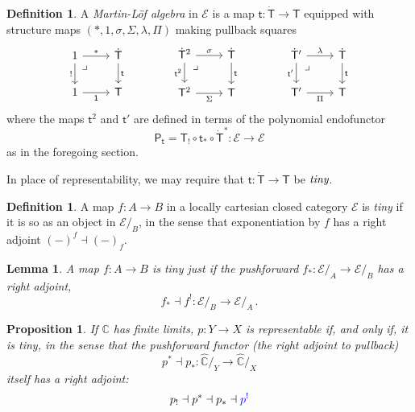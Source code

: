 \documentclass[12pt]{article}
\newcommand{\C}{\ensuremath{\mathbb{C}}}
\newcommand{\EE}{\ensuremath{\mathcal{E}}}
\newcommand{\alg}[1]{\ensuremath{\mathsf{#1}}}
\renewcommand{\to}{\ensuremath{\rightarrow}}
\newcommand{\too}{\ensuremath{\longrightarrow}}
\renewcommand{\t}{\ensuremath{\mathsf{t}}}
\newcommand{\tT}{\ensuremath{{\t}:\TT\to\T}}
\newcommand{\T}{\ensuremath{\mathsf{T}}}
\newcommand{\TT}{\ensuremath{\dot{\mathsf{T}}}}
\newcommand{\pbcorner}{\arrow[dr,phantom,"\lrcorner" very near start, shift right=.5ex]} %
\newtheorem{proposition}[theorem]{Proposition}
\newtheorem{lemma}[theorem]{Lemma}
\theoremstyle{remark}
\theoremstyle{definition}
\newtheorem{definition}[theorem]{Definition}
\begin{document}
\begin{definition}\label{def:MLalg}
A \emph{Martin-L\"of algebra} in $\EE$ is a map $\tT$ equipped with structure maps $(*, 1, \sigma, \Sigma, \lambda, \Pi)$ making pullback squares 
\begin{equation}\label{diag:MLalg}
\begin{tikzcd}
	1 \ar[r,"*"] \ar[d,swap,"!"] \pbcorner &  \TT \ar[d, "\t"]\\  
	1 \ar[r, swap,"\mathsf{1}"] & \T
 \end{tikzcd}\qquad \qquad 
 \begin{tikzcd}
	\TT^2  \ar[r,"\sigma"] \ar[d,swap,"\t^2"] \pbcorner &  \TT \ar[d, "\t"]\\  
	\T^2 \ar[r,swap, "\Sigma"] & \T
	 \end{tikzcd} \qquad \qquad 
	 \begin{tikzcd}
	\TT'  \ar[r,"\lambda"] \ar[d,swap,"\t' "] \pbcorner &  \TT \ar[d, "\t"]\\  
	\T' \ar[r,swap, "\Pi"] & \T
 \end{tikzcd} 
 \end{equation}
 where the maps $\t^2$ and $\t'$ are defined in terms of the polynomial endofunctor $$\alg{P}_\t = \T_! \circ \t_* \circ \TT^* : \EE\too\EE$$ as in the foregoing section.
\end{definition}

In place of representability, we may require that $\tT$ be $\emph{tiny}$.

\begin{definition}
 A map $f : A \to B$ in a locally cartesian closed category $\EE$ is \emph{tiny} if it is so as an object in $\EE/_B$, in the sense that  exponentiation by $f$  has a right adjoint $(-)^f \dashv (-)_f$. 
\end{definition}

\begin{lemma}
A map $f : A \to B$ is tiny just if the \emph{pushforward} $f_* : \EE/_A \to \EE/_B$ has a right adjoint,
\[
f_* \dashv f^! : \EE/_B \too \EE/_A\,.
\]
\end{lemma}

\begin{proposition}\label{prop:rep_is_tiny}
If $\C$ has finite limits, $p : Y \to X$ is representable if, and only if, it is \emph{tiny}, in the sense that the \emph{pushforward functor} (the right adjoint to pullback) 
\[
p^* \dashv p_* : \widehat{\C}/_{Y} \longrightarrow \widehat{\C}/_{X}
\]
itself has a \emph{right} adjoint:
\[
p_! \dashv p^*\dashv p_* \dashv {\color{blue}p^!}
\]
\end{proposition}
\end{document}
